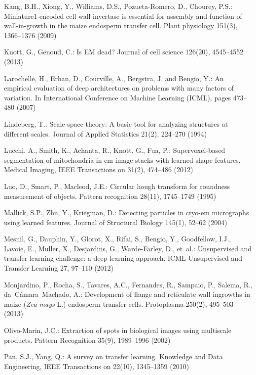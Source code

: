\documentclass[a4paper,11pt]{article}
\newcommand{\1}{\mathbbm{1}}
\theoremstyle{plain}
\begin{document}
\begin{thebibliography}{10}
Kang, B.H., Xiong, Y., Williams, D.S., Pozueta-Romero, D., Chourey, P.S.:
  Miniature1-encoded cell wall invertase is essential for assembly and function
  of wall-in-growth in the maize endosperm transfer cell. Plant physiology
  151(3),  1366--1376 (2009)

Knott, G., Genoud, C.: {Is EM dead?} Journal of cell science  126(20),
  4545--4552 (2013)

Larochelle, H., Erhan, D., Courville, A., Bergstra, J. and
Bengio, Y.: An empirical evaluation of deep architectures on problems with many factors of variation. In International Conference on Machine Learning (ICML), pages 473–480 (2007)

Lindeberg, T.: Scale-space theory: A basic tool for analyzing structures at
  different scales. Journal of Applied Statistics  21(2),  224--270 (1994)

Lucchi, A., Smith, K., Achanta, R., Knott, G., Fua, P.: Supervoxel-based
  segmentation of mitochondria in em image stacks with learned shape features.
  Medical Imaging, IEEE Transactions on  31(2),  474--486 (2012)

Luo, D., Smart, P., Macleod, J.E.: Circular hough transform for roundness
  measurement of objects. Pattern recognition  28(11),  1745--1749 (1995)

Mallick, S.P., Zhu, Y., Kriegman, D.: Detecting particles in cryo-em
  micrographs using learned features. {Journal of Structural Biology}  145(1),
  52--62 (2004)

Mesnil, G., Dauphin, Y., Glorot, X., Rifai, S., Bengio, Y., Goodfellow, I.J.,
  Lavoie, E., Muller, X., Desjardins, G., Warde-Farley, D., et~al.:
  Unsupervised and transfer learning challenge: a deep learning approach. ICML
  Unsupervised and Transfer Learning  27,  97--110 (2012)

Monjardino, P., Rocha, S., Tavares, A.C., Fernandes, R., Sampaio, P., Salema,
  R., da~C{\^a}mara~Machado, A.: {Development of flange and reticulate wall
  ingrowths in maize (\emph{Zea mays} L.) endosperm transfer cells}.
  Protoplasma  250(2),  495--503 (2013)

Olivo-Marin, J.C.: Extraction of spots in biological images using multiscale
  products. Pattern Recognition  35(9),  1989--1996 (2002)

Pan, S.J., Yang, Q.: A survey on transfer learning. Knowledge and Data
  Engineering, IEEE Transactions on  22(10),  1345--1359 (2010)


\end{thebibliography}
\end{document}
